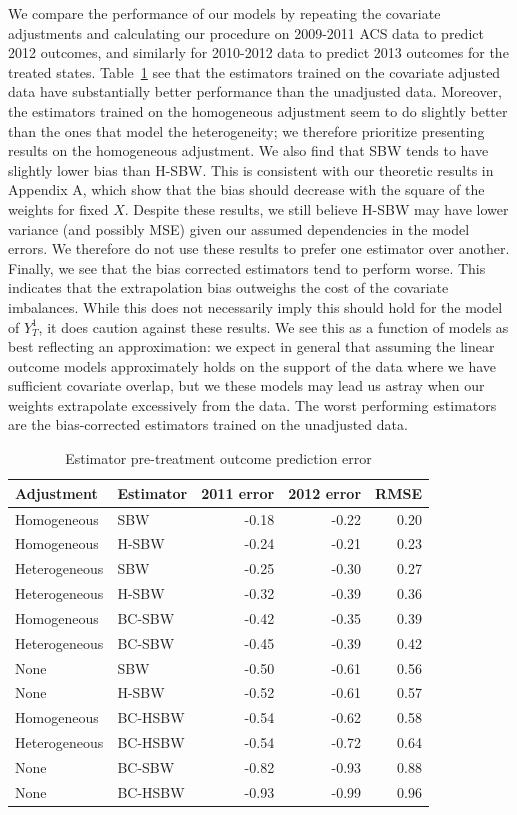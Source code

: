 We compare the performance of our models by repeating the covariate adjustments and calculating our procedure on 2009-2011 ACS data to predict 2012 outcomes, and similarly for 2010-2012 data to predict 2013 outcomes for the treated states. Table~\ref{tab:pretxpred} see that the estimators trained on the covariate adjusted data have substantially better performance than the unadjusted data. Moreover, the estimators trained on the homogeneous adjustment seem to do slightly better than the ones that model the heterogeneity; we therefore prioritize presenting results on the homogeneous adjustment. We also find that SBW tends to have slightly lower bias than H-SBW. This is consistent with our theoretic results in Appendix A, which show that the bias should decrease with the square of the weights for fixed $X$. Despite these results, we still believe H-SBW may have lower variance (and possibly MSE) given our assumed dependencies in the model errors. We therefore do not use these results to prefer one estimator over another. Finally, we see that the bias corrected estimators tend to perform worse. This indicates that the extrapolation bias outweighs the cost of the covariate imbalances. While this does not necessarily imply this should hold for the model of $Y^1_T$, it does caution against these results. We see this as a function of models as best reflecting an approximation: we expect in general that assuming the linear outcome models approximately holds on the support of the data where we have sufficient covariate overlap, but we these models may lead us astray when our weights extrapolate excessively from the data. The worst performing estimators are the bias-corrected estimators trained on the unadjusted data.

\begin{table}[ht]
\caption{Estimator pre-treatment outcome prediction error}
\label{tab:pretxpred}
\begin{tabular}{llrrr}
  \hline
Adjustment & Estimator & 2011 error & 2012 error & RMSE \\ 
  \hline
Homogeneous & SBW & -0.18 & -0.22 & 0.20 \\ 
  Homogeneous & H-SBW & -0.24 & -0.21 & 0.23 \\ 
  Heterogeneous & SBW & -0.25 & -0.30 & 0.27 \\ 
  Heterogeneous & H-SBW & -0.32 & -0.39 & 0.36 \\ 
  Homogeneous & BC-SBW & -0.42 & -0.35 & 0.39 \\ 
  Heterogeneous & BC-SBW & -0.45 & -0.39 & 0.42 \\ 
  None & SBW & -0.50 & -0.61 & 0.56 \\ 
  None & H-SBW & -0.52 & -0.61 & 0.57 \\ 
  Homogeneous & BC-HSBW & -0.54 & -0.62 & 0.58 \\ 
  Heterogeneous & BC-HSBW & -0.54 & -0.72 & 0.64 \\ 
  None & BC-SBW & -0.82 & -0.93 & 0.88 \\ 
  None & BC-HSBW & -0.93 & -0.99 & 0.96 \\ 
   \hline
\end{tabular}
\end{table}

